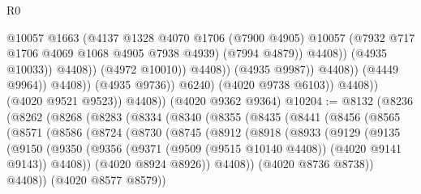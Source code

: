 \begin{lexlean}{R0}
\begin{coremodule}
                                                @10057
                                                @1663
                                                (@4137
                                                  @1328
                                                  @4070
                                                  @1706
                                                  (@7900 @4905)
                                                  @10057
                                                  (@7932 @717 @1706 @4069 @1068 @4905 @7938 @4939)
                                                  (@7994 @4879))
                                                @4408))
                                            (@4935 @10033))
                                          @4408))
                                      (@4972 @10010))
                                    @4408))
                                (@4935 @9987))
                              @4408))
                          (@4449 @9964))
                        @4408))
                    (@4935 @9736))
                  @6240)
                (@4020 @9738 @6103))
              @4408))
          (@4020 @9521 @9523))
        @4408))
    (@4020 @9362 @9364)
@10204 := @8132
    (@8236
      (@8262
        (@8268
          (@8283
            (@8334
              (@8340
                (@8355
                  (@8435
                    (@8441
                      (@8456
                        (@8565
                          (@8571
                            (@8586
                              (@8724
                                (@8730
                                  (@8745
                                    (@8912
                                      (@8918
                                        (@8933
                                          (@9129
                                            (@9135
                                              (@9150
                                                (@9350
                                                  (@9356
                                                    (@9371
                                                      (@9509 (@9515 @10140 @4408))
                                                      (@4020 @9141 @9143))
                                                    @4408))
                                                (@4020 @8924 @8926))
                                              @4408))
                                          (@4020 @8736 @8738))
                                        @4408))
                                    (@4020 @8577 @8579))

\end{coremodule}
\end{lexlean}
